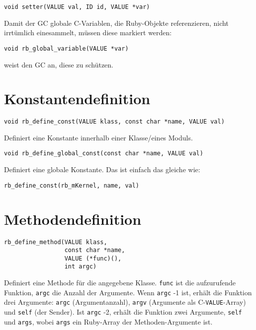 \begin{lstlisting}
void setter(VALUE val, ID id, VALUE *var)
\end{lstlisting}

Damit der GC globale C-Variablen, die Ruby-Objekte referenzieren,
nicht irrtümlich einesammelt, müssen diese markiert werden:

\begin{lstlisting}
void rb_global_variable(VALUE *var)
\end{lstlisting}

\noindent weist den GC an, diese zu schützen.

\section{Konstantendefinition}
\label{sec:api-const}

\begin{lstlisting}
void rb_define_const(VALUE klass, const char *name, VALUE val)
\end{lstlisting}

\noindent Definiert eine Konstante innerhalb einer Klasse/eines
Moduls.

\begin{lstlisting}
void rb_define_global_const(const char *name, VALUE val)
\end{lstlisting}

\noindent Definiert eine globale Konstante. Das ist einfach das
gleiche wie:

\begin{lstlisting}
rb_define_const(rb_mKernel, name, val)
\end{lstlisting}

\section{Methodendefinition}
\label{sec:mapi-meth}

\begin{lstlisting}
rb_define_method(VALUE klass,
                 const char *name,
                 VALUE (*func)(),
                 int argc)
\end{lstlisting}

\noindent Definiert eine Methode für die angegebene
Klasse. \verb+func+ ist die aufzurufende Funktion, \verb+argc+ die
Anzahl der Argumente. Wenn \verb+argc+ -1 ist, erhält die Funktion
drei Argumente: \verb+argc+ (Argumentanzahl), \verb+argv+ (Argumente
als C-\verb+VALUE+-Array) und \verb+self+ (der Sender). Ist
\verb+argc+ -2, erhält die Funktion zwei Argumente, \verb+self+ und
\verb+args+, wobei \verb+args+ ein Ruby-Array der Methoden-Argumente
ist.

